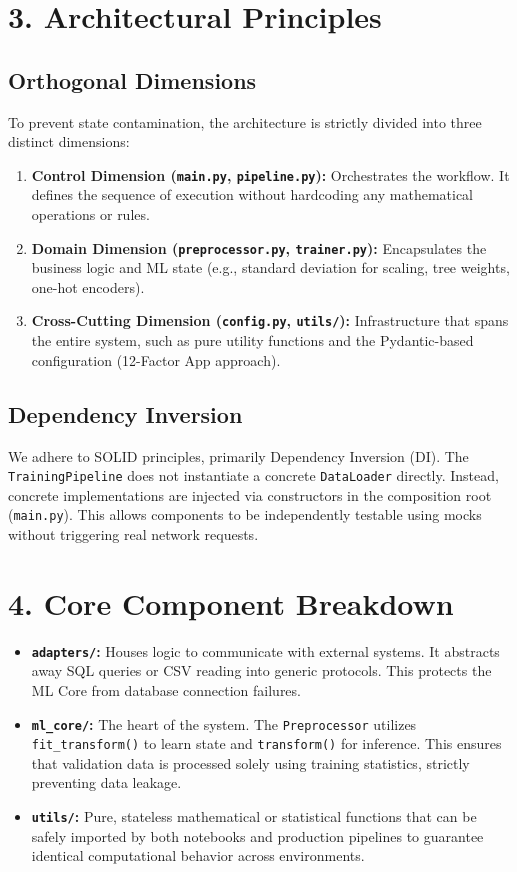 \documentclass{modern-c4}
\begin{document}
\section{3. Architectural Principles}
\subsection{Orthogonal Dimensions}
To prevent state contamination, the architecture is strictly divided into three distinct dimensions:
\begin{enumerate}
    \item \textbf{Control Dimension (\texttt{main.py}, \texttt{pipeline.py}):} Orchestrates the workflow. It defines the sequence of execution without hardcoding any mathematical operations or rules.
    \item \textbf{Domain Dimension (\texttt{preprocessor.py}, \texttt{trainer.py}):} Encapsulates the business logic and ML state (e.g., standard deviation for scaling, tree weights, one-hot encoders).
    \item \textbf{Cross-Cutting Dimension (\texttt{config.py}, \texttt{utils/}):} Infrastructure that spans the entire system, such as pure utility functions and the Pydantic-based configuration (12-Factor App approach).
\end{enumerate}

\subsection{Dependency Inversion}
We adhere to SOLID principles, primarily Dependency Inversion (DI). The \texttt{TrainingPipeline} does not instantiate a concrete \texttt{DataLoader} directly. Instead, concrete implementations are injected via constructors in the composition root (\texttt{main.py}). This allows components to be independently testable using mocks without triggering real network requests.

\section{4. Core Component Breakdown}
\begin{itemize}
    \item \textbf{\texttt{adapters/}:} Houses logic to communicate with external systems. It abstracts away SQL queries or CSV reading into generic protocols. This protects the ML Core from database connection failures.
    \item \textbf{\texttt{ml\_core/}:} The heart of the system. The \texttt{Preprocessor} utilizes \texttt{fit\_transform()} to learn state and \texttt{transform()} for inference. This ensures that validation data is processed solely using training statistics, strictly preventing data leakage.
    \item \textbf{\texttt{utils/}:} Pure, stateless mathematical or statistical functions that can be safely imported by both notebooks and production pipelines to guarantee identical computational behavior across environments.
\end{itemize}
\end{document}
